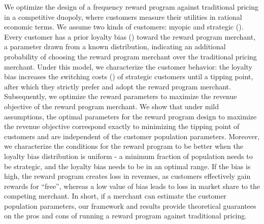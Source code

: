 We optimize the design of a frequency reward program against traditional pricing in a competitive duopoly, where customers measure their utilities in rational economic terms.
We assume two kinds of customers: myopic and strategic (\cite{yilmaz2016upgrade}). 
Every customer has a prior loyalty bias (\cite{fader1993excess}) toward the reward program merchant, a parameter drawn from a known distribution, indicating an additional probability of choosing the reward program merchant over the traditional pricing merchant.
Under this model, we characterize the customer behavior: the loyalty bias increases the switching costs (\cite{klemperer1995competition}) of strategic customers until a tipping point, after which they strictly prefer and adopt the reward program merchant. 
Subsequently, we optimize the reward parameters to maximize the revenue objective of the reward program merchant.
We show that under mild assumptions, the optimal parameters for the reward program design to maximize the revenue objective correspond exactly to minimizing the tipping point of customers and are independent of the customer population parameters. 
Moreover, we characterize the conditions for the reward program to be better when the loyalty bias distribution is uniform - a minimum fraction of population needs to be strategic, and the loyalty bias needs to be in an optimal range.
If the bias is high, the reward program creates loss in revenues, as customers effectively gain rewards for ``free'', whereas a low value of bias leads to loss in market share to the competing merchant.
In short, if a merchant can estimate the customer population parameters, our framework and results provide theoretical guarantees on the pros and cons of running a reward program against traditional pricing.
